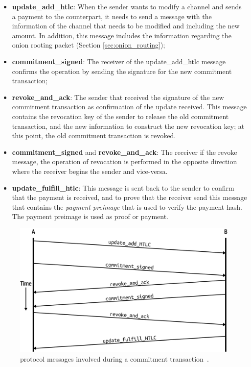 \begin{itemize}
  \item {\bf update\_add\_htlc}: When the sender wants to modify a channel and sends a payment to the counterpart, it needs to send a message with the information of the channel that needs to be modified and including the new amount. In addition, this message includes  the information regarding the onion rooting packet (Section \ref{sec:onion_routing});
  
  \item {\bf commitment\_signed}: The receiver of the update\_add\_htlc message confirms the operation by sending the signature for the new commitment transaction;
  
  \item {\bf revoke\_and\_ack}: The sender that received the signature of the new commitment transaction as confirmation of the update received. This message contains the revocation key of the sender to release the old commitment transaction, and the new information to construct the new revocation key; at this point, the old commitment transaction is revoked.
  
  \item {\bf commitment\_signed} and {\bf revoke\_and\_ack}: The receiver if the revoke message, the operation of revocation is performed in the opposite direction where the receiver begins the sender and vice-versa.
  
  \item {\bf update\_fulfill\_htlc}: This message is sent back to the sender to confirm that the payment is received,
      and to prove that the receiver send this message that contains the \emph{payment preimage} 
        that is used to verify the payment hash. The payment preimage is used as proof or payment.
\end{itemize}


\begin{figure}[h]
  \begin{center}
  \includegraphics[width=0.6\columnwidth]{imgs/mtln_0903.png}
  \end{center}
    \caption{{\LN} protocol messages involved during a commitment transaction~\cite{lnbook}.}
  \label{fig:commitment_transaction_ln_messages}
\end{figure}


